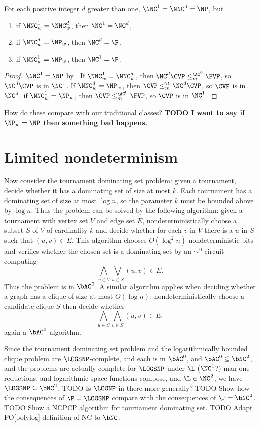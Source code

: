 \documentclass{article}
\newcommand{\todo}[1]{\textbf{TODO #1}}
\begin{document}
\begin{theorem}
  For each positive integer $d$ greater than one, $\NNC^1 = \NNC^d = \NP$, but
  \begin{enumerate}
  \item if $\NNC^1_w = \NNC^d_w$, then $\NC^1 = \NC^d$,
  \item if $\NNC^d_w = \NP_w$, then $\NC^d = \P$.
  \item if $\NNC^1_w = \NP_w$, then $\NC^1 = \P$.
  \end{enumerate}
\end{theorem}
\begin{proof}
  $\NNC^1 = \NP$ by \autocite[Theorem~2.2]{wolf94}.
  If $\NNC^1_w = \NNC^d_w$, then $\NC^d \CVP \leq_m^{\AC^0} \FVP$, so $\NC^d \CVP$ is in $\NC^1$.
  If $\NNC^d_w = \NP_w$, then $\CVP \leq_m^{\L} \NC^d \CVP$, so $\CVP$ is in $\NC^d$.
  if $\NNC^1_w = \NP_w$, then $\CVP \leq_m^{\AC^0} \FVP$, so $\CVP$ is in $\NC^1$.
\end{proof}

How do these compare with our traditional classes?
\todo{I want to say if $\NP_w = \NP$ then something bad happens.}

\section{Limited nondeterminism}

Now consider the tournament dominating set problem: given a tournament, decide whether it has a dominating set of size at most $k$.
Each tournament has a dominating set of size at most $\log n$, so the parameter $k$ must be bounded above by $\log n$.
Thus the problem can be solved by the following algorithm: given a tournament with vertex set $V$ and edge set $E$, nondeterministically choose a subset $S$ of $V$ of cardinality $k$ and decide whether for each $v$ in $V$ there is a $u$ in $S$ such that $(u, v) \in E$.
This algorithm chooses $O(\log^2 n)$ nondeterministic bits and verifies whether the chosen set is a dominating set by an $\AC^0$ circuit computing
$$
\bigwedge_{v \in V} \bigvee_{u \in S} (u, v) \in E.
$$
Thus the problem is in $\bAC^0$.
A similar algorithm applies when deciding whether a graph has a clique of size at most $O(\log n)$: nondeterministically choose a candidate clique $S$ then decide whether
$$
\bigwedge_{u \in S} \bigwedge_{v \in S} (u, v) \in E,
$$
again a $\bAC^0$ algorithm.

Since the tournament dominating set problem and the logarithmically bounded clique problem are $\LOGSNP$-complete, and each is in $\bAC^0$, and $\bAC^0 \subseteq \bNC^2$, and the problems are actually complete for $\LOGSNP$ under $\L$ ($\NC^1$?) man-one reductions, and logarithmic space functions compose, and $\L \in \NC^2$, we have $\LOGSNP \subseteq \bNC^2$.
TODO Is $\LOGNP$ in there more generally?
TODO Show how the consequences of $\P = \LOGSNP$ compare with the consequences of $\P = \bNC^2$.
TODO Show a NCPCP algorithm for tournament dominating set.
TODO Adapt FO[polylog] definition of NC to $\bNC$.
\end{document}
